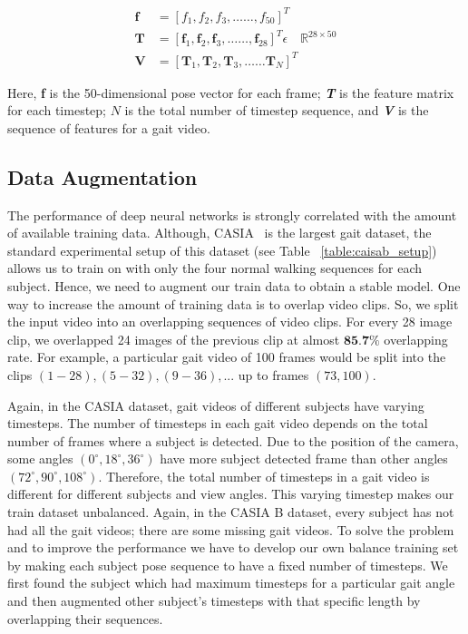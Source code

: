 \begin{equation}
\label{equ:feature_preprocess}
\begin{split}
\boldsymbol{f} &= {[f_1, f_2, f_3, \ldots \ldots, f_{50}]}^T \\
\boldsymbol {T} &= {[\boldsymbol f_1, \boldsymbol f_2, \boldsymbol f_3,  \ldots \ldots, \boldsymbol f_{28}]}^T \epsilon \quad \mathbb {R}^{28\times 50}\\
\boldsymbol V &= {[\boldsymbol T_1, \boldsymbol T_2, \boldsymbol T_3,  \ldots \ldots \boldsymbol T_{N}]}^T 
\end{split}
\end{equation}

Here, \textbf{f} is the 50-dimensional pose vector for each frame; \textit{\textbf{T}} is the feature matrix for each timestep; $ N $ is the total number of timestep sequence, and \textit{\textbf{V}} is the sequence of features for a gait video. 



\subsection{Data Augmentation}
The performance of deep neural networks is strongly correlated with the amount of available training data. Although, CASIA~\cite{Yu_06} is the largest gait dataset, the standard experimental setup of this dataset (see Table ~\ref{table:caisab_setup}) allows us to train on with only the four normal walking sequences for each subject. Hence, we need to augment our train data to obtain a stable model. One way to increase the amount of training data is to overlap video clips. So, we split the input video into an overlapping sequences of video clips. For every 28 image clip, we overlapped 24 images of the previous clip at almost $ \textbf{85.7\%} $ overlapping rate. For example, a particular gait video of 100 frames would be split into the clips $(1-28), (5-32), (9-36), ...$ up to frames $(73, 100)$. 

Again, in the CASIA dataset, gait videos of different subjects have varying timesteps. The number of timesteps in each gait video depends on the total number of frames where a subject is detected. Due to the position of the camera, some angles ${(0^{\circ}, 18^{\circ}, 36^{\circ})}$ have more subject detected frame than other angles ${(72^{\circ}, 90^{\circ}, 108^{\circ})}$. Therefore, the total number of timesteps in a gait video is different for different subjects and view angles. This varying timestep makes our train dataset unbalanced. Again, in the CASIA B dataset, every subject has not had all the gait videos; there are some missing gait videos. To solve the problem and to improve the performance we have to develop our own balance training set by making each subject pose sequence to have a fixed number of timesteps. We first found the subject which had maximum timesteps for a particular gait angle and then augmented other subject's timesteps with that specific length by overlapping their sequences.

